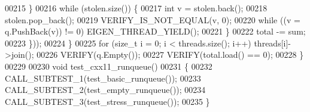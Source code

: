 \begin{DoxyCode}
00215       \}
00216       \textcolor{keywordflow}{while} (stolen.size()) \{
00217         \textcolor{keywordtype}{int} v = stolen.back();
00218         stolen.pop\_back();
00219         VERIFY\_IS\_NOT\_EQUAL(v, 0);
00220         \textcolor{keywordflow}{while} ((v = q.PushBack(v)) != 0) EIGEN\_THREAD\_YIELD();
00221       \}
00222       total -= sum;
00223     \}));
00224   \}
00225   \textcolor{keywordflow}{for} (\textcolor{keywordtype}{size\_t} i = 0; i < threads.size(); i++) threads[i]->join();
00226   VERIFY(q.Empty());
00227   VERIFY(total.load() == 0);
00228 \}
00229 
00230 \textcolor{keywordtype}{void} test\_cxx11\_runqueue()
00231 \{
00232   CALL\_SUBTEST\_1(test\_basic\_runqueue());
00233   CALL\_SUBTEST\_2(test\_empty\_runqueue());
00234   CALL\_SUBTEST\_3(test\_stress\_runqueue());
00235 \}
\end{DoxyCode}
